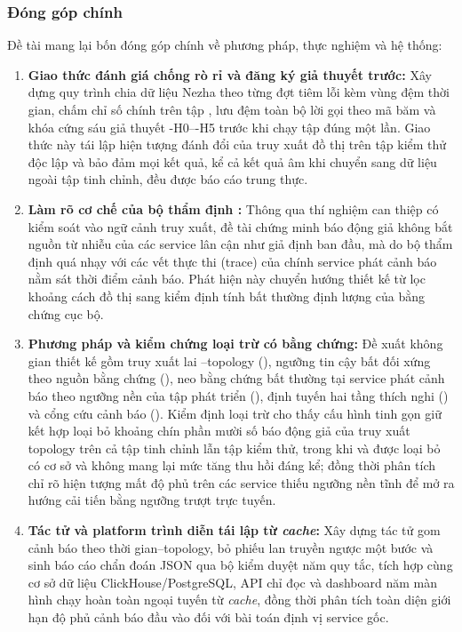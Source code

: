 \subsubsection{Đóng góp chính}
\label{sec:ch1-dong-gop}

Đề tài mang lại bốn đóng góp chính về phương pháp, thực nghiệm và hệ thống:
\begin{enumerate}
    \item \textbf{Giao thức đánh giá chống rò rỉ và đăng ký giả thuyết trước:} Xây dựng quy trình chia dữ liệu Nezha theo từng đợt tiêm lỗi kèm vùng đệm thời gian, chấm chỉ số chính trên tập , lưu đệm toàn bộ lời gọi  theo mã băm và khóa cứng sáu giả thuyết \hyp{H0}--\hyp{H5} trước khi chạy tập  đúng một lần. Giao thức này tái lập hiện tượng đánh đổi của truy xuất đồ thị trên tập kiểm thử độc lập và bảo đảm mọi kết quả, kể cả kết quả âm khi chuyển sang dữ liệu ngoài tập tinh chỉnh, đều được báo cáo trung thực.
    \item \textbf{Làm rõ cơ chế  của bộ thẩm định :} Thông qua thí nghiệm can thiệp có kiểm soát vào ngữ cảnh truy xuất, đề tài chứng minh báo động giả không bắt nguồn từ nhiễu của các service lân cận như giả định ban đầu, mà do bộ thẩm định quá nhạy với các vết thực thi (trace) của chính service phát cảnh báo nằm sát thời điểm cảnh báo. Phát hiện này chuyển hướng thiết kế từ lọc khoảng cách đồ thị sang kiểm định tính bất thường định lượng của bằng chứng cục bộ.
    \item \textbf{Phương pháp \CTAV{} và kiểm chứng loại trừ có bằng chứng:} Đề xuất không gian thiết kế gồm truy xuất lai --topology (), ngưỡng tin cậy bất đối xứng theo nguồn bằng chứng (), neo bằng chứng bất thường tại service phát cảnh báo theo ngưỡng nền của tập phát triển (), định tuyến hai tầng thích nghi () và cổng cứu cảnh báo  (). Kiểm định loại trừ cho thấy cấu hình tinh gọn giữ  kết hợp  loại bỏ khoảng chín phần mười số báo động giả của truy xuất topology trên cả tập tinh chỉnh lẫn tập kiểm thử, trong khi  và  được loại bỏ có cơ sở và  không mang lại mức tăng thu hồi đáng kể; đồng thời phân tích chỉ rõ hiện tượng mất độ phủ trên các service thiếu ngưỡng nền tĩnh để mở ra hướng cải tiến bằng ngưỡng trượt trực tuyến.
    \item \textbf{Tác tử  và platform trình diễn tái lập từ \textit{cache}:} Xây dựng tác tử gom cảnh báo theo thời gian--topology, bỏ phiếu lan truyền ngược một bước và sinh báo cáo chẩn đoán JSON qua bộ kiểm duyệt năm quy tắc, tích hợp cùng cơ sở dữ liệu ClickHouse/PostgreSQL, API chỉ đọc và dashboard năm màn hình chạy hoàn toàn ngoại tuyến từ \textit{cache}, đồng thời phân tích toàn diện giới hạn độ phủ cảnh báo đầu vào đối với bài toán định vị service gốc.
\end{enumerate}

